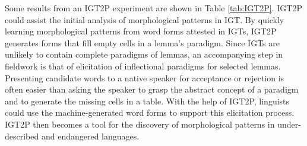 \documentclass[12pt]{article}
\begin{document}
Some results from an IGT2P experiment are shown in Table \ref{tab:IGT2P}. IGT2P could assist the initial analysis of morphological patterns in IGT. By quickly learning morphological patterns from word forms attested in IGTs, IGT2P generates forms that fill empty cells in a lemma's paradigm. Since IGTs are unlikely to contain complete paradigms of lemmas, an accompanying step in fieldwork is that of elicitation of inflectional paradigms for selected lemmas. Presenting candidate words to a native speaker for acceptance or rejection is often easier than asking the speaker to grasp the abstract concept of a paradigm and to generate the missing cells in a table. With the help of IGT2P, linguists could use the machine-generated word forms to support this elicitation process. IGT2P then becomes a tool for the discovery of morphological patterns in under-described and endangered languages. 
\end{document}
